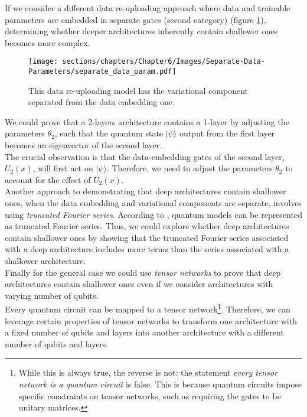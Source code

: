 \begin{itemize}
    If we consider a different data re-uploading approach where data and trainable parameters are 
    embedded in separate gates (second category) (figure \ref{fig:separate-data-var}), 
    determining whether deeper architectures inherently contain shallower ones becomes more complex.

    \begin{figure}[h]
        \centering
        \texttt{[image: sections/chapters/Chapter6/Images/Separate-Data-Parameters/separate\_data\_param.pdf]}
    \caption{This data re-uploading model has the variational component separated from the data embedding one.}
    \label{fig:separate-data-var}
    \end{figure}

    We could prove that a 2-layers architecture contains a 1-layer by adjusting the parameters $\theta_2$, 
    such that the quantum state $|\psi \rangle$ output from the first layer becomes an eigenvector 
    of the second layer.\\
    The crucial observation is that the data-embedding gates of the second layer, $U_2(x)$, 
    will first act on $|\psi \rangle$. Therefore, we need to adjust the parameters $\theta_2$ 
    to account for the effect of $U_2(x)$.\\

    Another approach to demonstrating that deep architectures contain shallower ones, when the data 
    embedding and variational components are separate, involves using \textit{truncated Fourier series}. 
    According to \cite{Schuld_2021}, quantum models can be represented as truncated Fourier series. 
    Thus, we could explore whether deep architectures contain shallower ones by showing that the 
    truncated Fourier series associated with a deep architecture includes more terms than the series 
    associated with a shallower architecture.\\

    Finally for the general case we could use \textit{tensor networks} to prove that deep 
    architectures contain shallower ones even if we consider architectures with varying number of 
    qubits.\\
    Every quantum circuit can be mapped to a tensor network\footnote[3]{While this is 
    always true, the reverse is not: the statement \textit{every tensor network is a quantum 
    circuit} is false. This is because quantum circuits impose specific constraints on tensor 
    networks, such as requiring the gates to be unitary matrices.}. Therefore, we can leverage 
    certain properties of tensor networks to transform one architecture with a fixed number of 
    qubits and layers into another architecture with a different number of qubits and layers.


\end{itemize}
